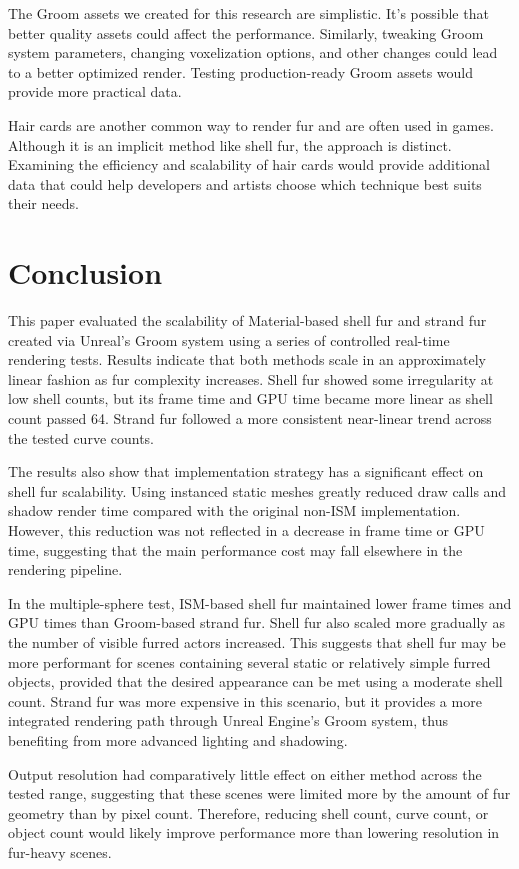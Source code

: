 \documentclass{article}
\begin{document}
The Groom assets we created for this research are simplistic. It's possible that better quality assets could affect the performance. Similarly, tweaking Groom system parameters, changing voxelization options, and other changes could lead to a better optimized render. Testing production-ready Groom assets would provide more practical data.

Hair cards are another common way to render fur and are often used in games. Although it is an implicit method like shell fur, the approach is distinct. Examining the efficiency and scalability of hair cards would provide additional data that could help developers and artists choose which technique best suits their needs.

\section{Conclusion}

This paper evaluated the scalability of Material-based shell fur and strand fur created via Unreal's Groom system using a series of controlled real-time rendering tests. Results indicate that both methods scale in an approximately linear fashion as fur complexity increases. Shell fur showed some irregularity at low shell counts, but its frame time and GPU time became more linear as shell count passed 64. Strand fur followed a more consistent near-linear trend across the tested curve counts.

The results also show that implementation strategy has a significant effect on shell fur scalability. Using instanced static meshes greatly reduced draw calls and shadow render time compared with the original non-ISM implementation. However, this reduction was not reflected in a decrease in frame time or GPU time, suggesting that the main performance cost may fall elsewhere in the rendering pipeline.

In the multiple-sphere test, ISM-based shell fur maintained lower frame times and GPU times than Groom-based strand fur. Shell fur also scaled more gradually as the number of visible furred actors increased. This suggests that shell fur may be more performant for scenes containing several static or relatively simple furred objects, provided that the desired appearance can be met using a moderate shell count. Strand fur was more expensive in this scenario, but it provides a more integrated rendering path through Unreal Engine's Groom system, thus benefiting from more advanced lighting and shadowing.

Output resolution had comparatively little effect on either method across the tested range, suggesting that these scenes were limited more by the amount of fur geometry than by pixel count. Therefore, reducing shell count, curve count, or object count would likely improve performance more than lowering resolution in fur-heavy scenes.
\end{document}
